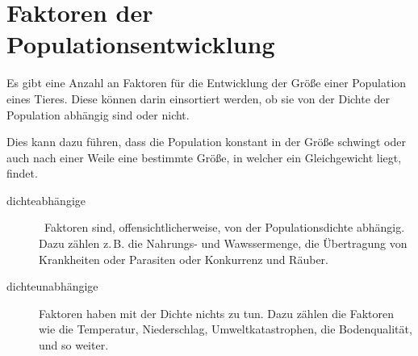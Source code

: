 \documentclass{article}
\begin{document}
\section{Faktoren der Populationsentwicklung} 
Es gibt eine Anzahl an Faktoren für die Entwicklung der Größe einer Population eines Tieres. Diese können darin einsortiert werden, ob sie von der Dichte der Population abhängig sind oder nicht.
 
Dies kann dazu führen, dass die Population konstant in der Größe schwingt oder auch nach einer Weile eine bestimmte Größe, in welcher ein Gleichgewicht liegt, findet.
\begin{description}
 \item[dichteabhängige] Faktoren sind, offensichtlicherweise, von der Populationsdichte abhängig. Dazu zählen z.\,B. die Nahrungs- und Wawssermenge, die Übertragung von Krankheiten oder Parasiten oder Konkurrenz und Räuber.
 \item[dichteunabhängige] Faktoren haben mit der Dichte nichts zu tun. Dazu zählen die Faktoren wie die Temperatur, Niederschlag, Umweltkatastrophen, die Bodenqualität, und so weiter.
\end{description} 
\end{document}
